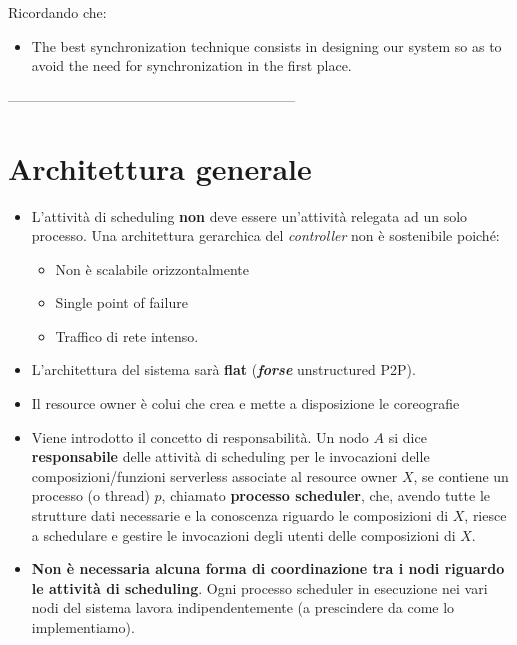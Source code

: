 \documentclass[10pt,a4paper]{article}
\begin{document}
Ricordando che:

\begin{itemize}
\item The best synchronization technique consists in designing our system so as to avoid
the need for synchronization in the first place.
\end{itemize}

--------------------------------------------------------------

\section{Architettura generale}

\begin{itemize}
\item L'attività di scheduling \textbf{non} deve essere un'attività relegata ad un solo processo. Una architettura gerarchica del \textit{controller} non è sostenibile poiché:

\begin{itemize}
\item Non è scalabile orizzontalmente
\item Single point of failure
\item Traffico di rete intenso.
\end{itemize}



\item L'architettura del sistema sarà \textbf{flat} (\textbf{\textit{forse}} unstructured P2P).

\item Il resource owner è colui che crea e mette a disposizione le coreografie

\item Viene introdotto il concetto di responsabilità. Un nodo $A$ si dice \textbf{responsabile} delle attività di scheduling per le invocazioni delle composizioni/funzioni serverless associate al resource owner $X$, se contiene un processo (o thread) $p$, chiamato \textbf{processo scheduler}, che, avendo tutte le strutture dati necessarie e la conoscenza riguardo le composizioni di $X$, riesce a schedulare e gestire le invocazioni degli utenti delle composizioni di $X$.

\item \textbf{Non è necessaria alcuna forma di coordinazione tra i nodi riguardo le attività di scheduling}. Ogni processo scheduler in esecuzione nei vari nodi del sistema lavora indipendentemente (a prescindere da come lo implementiamo). 


\end{itemize}
\end{document}
